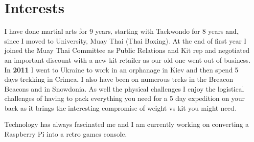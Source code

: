 \documentclass[11pt,a4paper,sans]{moderncv} %
\begin{document}
\section{Interests}

{
	I have done martial arts for 9 years, starting with Taekwondo for 8 years and, since I moved to University,  Muay Thai (Thai Boxing). At the end of first year I joined the Muay Thai Committee as Public Relations and Kit rep and negotiated an important discount with a new kit retailer as our old one went out of business. 
}
{
	In \textbf{2011} I went to Ukraine to work in an orphanage in Kiev and then spend 5 days trekking in Crimea. I also have been on numerous treks in the Breacon Beacons and in Snowdonia. As well the physical challenges I enjoy the logistical challenges of having to pack everything you need for a 5 day expedition on your back as it brings the interesting compromise of weight vs kit you might need.
}

{
	Technology has always fascinated me and I am currently working on converting a Raspberry Pi into a retro games console.
}
\end{document}
